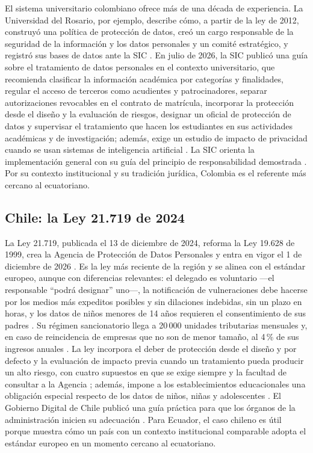 El sistema universitario colombiano ofrece más de una década de experiencia. La Universidad del Rosario, por ejemplo, describe cómo, a partir de la ley de 2012, construyó una política de protección de datos, creó un cargo responsable de la seguridad de la información y los datos personales y un comité estratégico, y registró sus bases de datos ante la SIC \cite{correa2024rosario}. En julio de 2026, la SIC publicó una guía sobre el tratamiento de datos personales en el contexto universitario, que recomienda clasificar la información académica por categorías y finalidades, regular el acceso de terceros como acudientes y patrocinadores, separar autorizaciones revocables en el contrato de matrícula, incorporar la protección desde el diseño y la evaluación de riesgos, designar un oficial de protección de datos y supervisar el tratamiento que hacen los estudiantes en sus actividades académicas y de investigación; además, exige un estudio de impacto de privacidad cuando se usan sistemas de inteligencia artificial \cite{sic2026universitario}. La SIC orienta la implementación general con su guía del principio de responsabilidad demostrada \cite{sic2015accountability}. Por su contexto institucional y su tradición jurídica, Colombia es el referente más cercano al ecuatoriano.

\subsection{Chile: la Ley 21.719 de 2024}
\label{sec:marco_chile}

La Ley 21.719, publicada el 13 de diciembre de 2024, reforma la Ley 19.628 de 1999, crea la Agencia de Protección de Datos Personales y entra en vigor el 1 de diciembre de 2026 \cite{chile2024ley21719}. Es la ley más reciente de la región y se alinea con el estándar europeo, aunque con diferencias relevantes: el delegado es voluntario ---el responsable ``podrá designar'' uno---, la notificación de vulneraciones debe hacerse por los medios más expeditos posibles y sin dilaciones indebidas, sin un plazo en horas, y los datos de niños menores de 14 años requieren el consentimiento de sus padres \cite{chile2024ley21719}. Su régimen sancionatorio llega a 20\,000 unidades tributarias mensuales y, en caso de reincidencia de empresas que no son de menor tamaño, al 4\,\% de sus ingresos anuales \cite{chile2024ley21719}. La ley incorpora el deber de protección desde el diseño y por defecto \cite[art.~14 quáter]{chile2024ley21719} y la evaluación de impacto previa cuando un tratamiento pueda producir un alto riesgo, con cuatro supuestos en que se exige siempre y la facultad de consultar a la Agencia \cite[art.~15 ter]{chile2024ley21719}; además, impone a los establecimientos educacionales una obligación especial respecto de los datos de niños, niñas y adolescentes \cite[art.~16 quáter]{chile2024ley21719}.
El Gobierno Digital de Chile publicó una guía práctica para que los órganos de la administración inicien su adecuación \cite{chile2026guia}. Para Ecuador, el caso chileno es útil porque muestra cómo un país con un contexto institucional comparable adopta el estándar europeo en un momento cercano al ecuatoriano.

